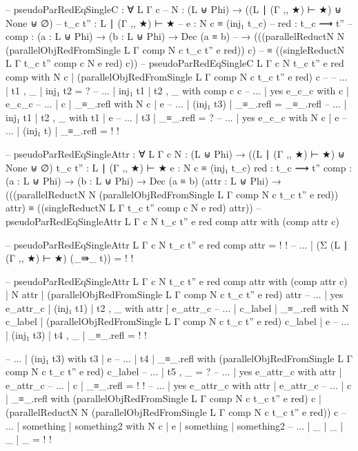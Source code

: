 {\begin{code}
  -- pseudoParRedEqSingleC : ∀ {L Γ c}
  --   {N : (L ⊎ Phi) → ((L ∣ (Γ ,, ★) ⊢ ★) ⊎ None ⊎ ∅)}
  --   {t_c t'' : L ∣ (Γ ,, ★) ⊢ ★}
  --   {e : N c ≡ (inj₁ t_c)}
  --   {red : t_c ⟿ t''}
  --   {comp : (a : L ⊎ Phi) → (b : L ⊎ Phi) → Dec (a ≡ b)}
  --   → (((parallelReductN N (parallelObjRedFromSingle {L} {Γ} {comp} N c t_c t'' e red)) c)
  --     ≡ ((singleReductN {L} {Γ} {t_c} {t''} {comp} c N e red) c))
  -- pseudoParRedEqSingleC  {L} {Γ} {c} {N} {t_c} {t''} {e} {red} {comp} with N c | (parallelObjRedFromSingle {L} {Γ} {comp} N c t_c t'' e red) c
  -- -- ... | t1 , _ | inj₁ t2 = ?
  -- ... | inj₁ t1 | t2 , _ with comp c c
  -- ...   | yes e_c_c with c | e_c_c
  -- ...     | c | _≡_.refl with N c | e
  -- ...       | (inj₁ t3) | _≡_.refl = _≡_.refl
  -- ... | inj₁ t1 | t2 , _ with t1 | e
  -- ...   | t3 | _≡_.refl = ?
  -- ...   | yes e_c_c with N c | e
  -- ...     | (inj₁ t) | _≡_.refl = {!   !}


  -- pseudoParRedEqSingleAttr : ∀ {L Γ c} {N : (L ⊎ Phi) → ((L ∣ (Γ ,, ★) ⊢ ★) ⊎ None ⊎ ∅)} {t_c t'' : L ∣ (Γ ,, ★) ⊢ ★} {e : N c ≡ (inj₁ t_c)} {red : t_c ⟿ t''} {comp : (a : L ⊎ Phi) → (b : L ⊎ Phi) → Dec (a ≡ b)} (attr : L ⊎ Phi) → (((parallelReductN N (parallelObjRedFromSingle {L} {Γ} {comp} N c t_c t'' e red)) attr) ≡ ((singleReductN {L} {Γ} {t_c} {t''} {comp} c N e red) attr))
  -- pseudoParRedEqSingleAttr {L} {Γ} {c} {N} {t_c} {t''} {e} {red} {comp} attr with (comp attr c)

  -- pseudoParRedEqSingleAttr {L} {Γ} {c} {N} {t_c} {t''} {e} {red} {comp} attr = {!   !}
  -- ... | (Σ (L ∣ (Γ ,, ★) ⊢ ★) (_⇛_ t)) = {!   !}



  -- pseudoParRedEqSingleAttr {L} {Γ} {c} {N} {t_c} {t''} {e} {red} {comp} attr with (comp attr c) | N attr | (parallelObjRedFromSingle {L} {Γ} {comp} N c t_c t'' e red) attr
  -- ... | yes e_attr_c | (inj₁ t1) | t2 , _ with attr | e_attr_c
  -- ...   | c_label | _≡_.refl with N c_label | (parallelObjRedFromSingle {L} {Γ} {comp} N c t_c t'' e red) c_label | e
  -- ...     | (inj₁ t3) | t4 , _ | _≡_.refl = {!   !}


  -- ...     | (inj₁ t3) with t3 | e
  -- ...       | t4 | _≡_.refl with (parallelObjRedFromSingle {L} {Γ} {comp} N c t_c t'' e red) c_label
  -- ...         | t5 , _ = ?
  -- ...   | yes e_attr_c with attr | e_attr_c
  -- ...     | c | _≡_.refl = {!   !}
  -- ... | yes e_attr_c with attr | e_attr_c
  -- ...   | c | _≡_.refl with (parallelObjRedFromSingle {L} {Γ} {comp} N c t_c t'' e red) c | (parallelReductN N (parallelObjRedFromSingle {L} {Γ} {comp} N c t_c t'' e red)) c
  -- ...     | something | something2 with N c | e | something | something2
  -- ...       | _ | _ | _ | _ = {!   !}


\end{code}}

